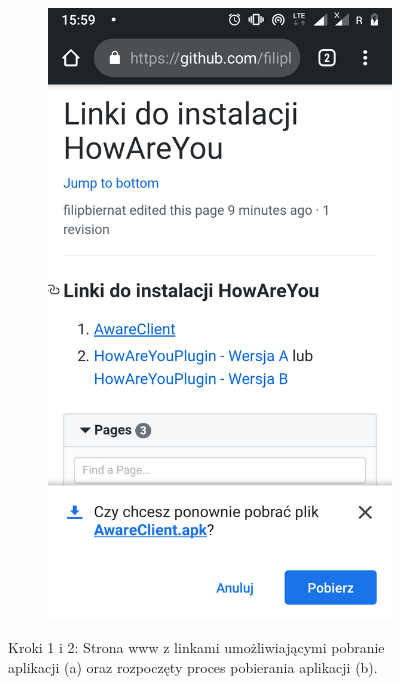 \begin{enumerate}
\begin{figure}[H]
\begin{subfigure}{0.35\textwidth}
			\includegraphics[scale=0.13]{dodatekA/2_2.png}
			\subcaption{\label{subfigure_b}}
		\end{subfigure}
		\caption{ Kroki 1 i 2: Strona www z linkami umożliwiającymi pobranie aplikacji (a) oraz rozpoczęty proces pobierania aplikacji (b).}
	\end{figure}
	

\end{enumerate}

